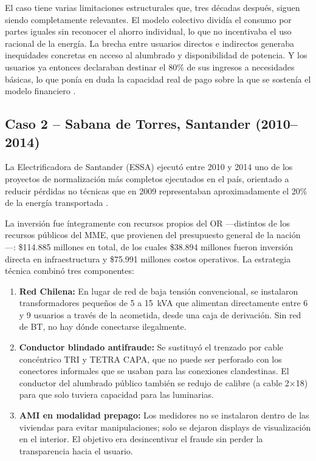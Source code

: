 El caso tiene varias limitaciones estructurales que, tres décadas después, siguen siendo completamente relevantes. El modelo colectivo dividía el consumo por partes iguales sin reconocer el ahorro individual, lo que no incentivaba el uso racional de la energía. La brecha entre usuarios directos e indirectos generaba inequidades concretas en acceso al alumbrado y disponibilidad de potencia. Y los usuarios ya entonces declaraban destinar el 80\% de sus ingresos a necesidades básicas, lo que ponía en duda la capacidad real de pago sobre la que se sostenía el modelo financiero \parencite{CastilloQuintana1991}.

\subsection{Caso 2 -- Sabana de Torres, Santander (2010--2014)}
\label{subsec:caso_santander}

La Electrificadora de Santander (ESSA) ejecutó entre 2010 y 2014 uno de los proyectos de normalización más completos ejecutados en el país, orientado a reducir pérdidas no técnicas que en 2009 representaban aproximadamente el 20\% de la energía transportada \parencite{MendezFuentes2013}.

La inversión fue íntegramente con recursos propios del OR —distintos de los recursos públicos del MME, que provienen del presupuesto general de la nación—: \$114.885 millones en total, de los cuales \$38.894 millones fueron inversión directa en infraestructura y \$75.991 millones costos operativos. La estrategia técnica combinó tres componentes:

\begin{enumerate}[label=\roman*), leftmargin=2cm, itemsep=4pt]
    \item \textbf{Red Chilena:} En lugar de red de baja tensión convencional, se instalaron transformadores pequeños de 5 a 15~kVA que alimentan directamente entre 6 y 9 usuarios a través de la acometida, desde una caja de derivación. Sin red de BT, no hay dónde conectarse ilegalmente.

    \item \textbf{Conductor blindado antifraude:} Se sustituyó el trenzado por cable concéntrico TRI y TETRA CAPA, que no puede ser perforado con los conectores informales que se usaban para las conexiones clandestinas. El conductor del alumbrado público también se redujo de calibre (a cable 2×18) para que solo tuviera capacidad para las luminarias.

    \item \textbf{AMI en modalidad prepago:} Los medidores no se instalaron dentro de las viviendas para evitar manipulaciones; solo se dejaron displays de visualización en el interior. El objetivo era desincentivar el fraude sin perder la transparencia hacia el usuario.
\end{enumerate}

